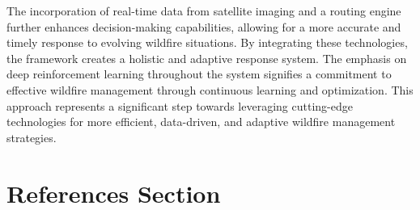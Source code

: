 \documentclass[lettersize,journal]{IEEEtran}
\begin{document}
The incorporation of real-time data from satellite imaging and a routing engine further enhances decision-making capabilities, allowing for a more accurate and timely response to evolving wildfire situations. By integrating these technologies, the framework creates a holistic and adaptive response system. The emphasis on deep reinforcement learning throughout the system signifies a commitment to effective wildfire management through continuous learning and optimization. This approach represents a significant step towards leveraging cutting-edge technologies for more efficient, data-driven, and adaptive wildfire management strategies.


\section{References Section}
 
%
%








% 




\end{document}

